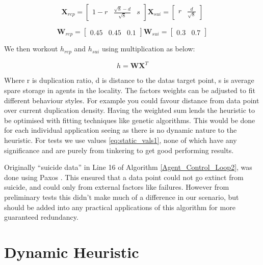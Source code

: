 \documentclass{UoYCSproject}
\begin{document}
\begin{equation}
\label{eq:static_vals2}
\textbf{X}_{rep} = \begin{bmatrix}1-r & \frac{\sqrt{8}-d}{\sqrt{8}} & s \end{bmatrix}
\textbf{X}_{sui} = \begin{bmatrix} r & \frac{d}{\sqrt{8}}\end{bmatrix}
\end{equation}

\begin{equation}
\label{eq:static_vals1}
\textbf{W}_{rep} = \begin{bmatrix}0.45 & 0.45 & 0.1\end{bmatrix}
\textbf{W}_{sui} = \begin{bmatrix}0.3 & 0.7 \end{bmatrix}
\end{equation}

We then workout $h_{rep}$ and $h_{sui}$ using multiplication as below:

\begin{equation}
\label{eq:10}
h = \textbf{W} \textbf{X} ^{T}
\end{equation}

Where r is duplication ratio, d is distance to the datas target point, s is average spare storage in agents in the locality.
The factors weights can be adjusted to fit different behaviour styles.
For example you could favour distance from data point over current duplication density.
Having the weighted sum lends the heuristic to be optimised with fitting techniques like genetic algorithms.
This would be done for each individual application seeing as there is no dynamic nature to the heuristic.
For tests we use values \ref{eq:static_vals1}, none of which have any significance and are purely from tinkering to get good performing results.

Originally “suicide data” in Line 16 of Algorithm \ref{Agent_Control_Loop2}, was done using Paxos \cite{Paxos}.
This ensured that a data point could not go extinct from suicide, and could only from external factors like failures.
However from preliminary tests this didn’t make much of a difference in our scenario, but should be added into any practical applications of this algorithm for more guaranteed redundancy.


\section{Dynamic Heuristic}
\label{sec:Simple3}
\end{document}
